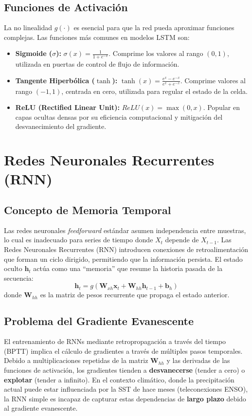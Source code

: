 \documentclass[titlepage,11pt]{report}
\begin{document}
\subsection{Funciones de Activación}
La no linealidad \(g(\cdot)\) es esencial para que la red pueda aproximar funciones complejas. Las funciones más comunes en modelos LSTM son:
\begin{itemize}
    \item \textbf{Sigmoide (\(\sigma\)):} \(\sigma(x) = \frac{1}{1+e^{-x}}\). Comprime los valores al rango \((0, 1)\), utilizada en puertas de control de flujo de información.
    \item \textbf{Tangente Hiperbólica (\(\tanh\)):} \(\tanh(x) = \frac{e^x - e^{-x}}{e^x + e^{-x}}\). Comprime valores al rango \((-1, 1)\), centrada en cero, utilizada para regular el estado de la celda.
    \item \textbf{ReLU (Rectified Linear Unit):} \(ReLU(x) = \max(0, x)\). Popular en capas ocultas densas por su eficiencia computacional y mitigación del desvanecimiento del gradiente.
\end{itemize}

\section{Redes Neuronales Recurrentes (RNN)}

\subsection{Concepto de Memoria Temporal}
Las redes neuronales \textit{feedforward} estándar asumen independencia entre muestras, lo cual es inadecuado para series de tiempo donde \(X_t\) depende de \(X_{t-1}\). Las Redes Neuronales Recurrentes (RNN) introducen conexiones de retroalimentación que forman un ciclo dirigido, permitiendo que la información persista. El estado oculto \(\mathbf{h}_t\) actúa como una ``memoria'' que resume la historia pasada de la secuencia:
\begin{equation}
    \mathbf{h}_t = g(\mathbf{W}_{xh} \mathbf{x}_t + \mathbf{W}_{hh} \mathbf{h}_{t-1} + \mathbf{b}_h)
\end{equation}
donde \(\mathbf{W}_{hh}\) es la matriz de pesos recurrente que propaga el estado anterior.

\subsection{Problema del Gradiente Evanescente}
El entrenamiento de RNNs mediante retropropagación a través del tiempo (BPTT) implica el cálculo de gradientes a través de múltiples pasos temporales. Debido a multiplicaciones repetidas de la matriz \(\mathbf{W}_{hh}\) y las derivadas de las funciones de activación, los gradientes tienden a \textbf{desvanecerse} (tender a cero) o \textbf{explotar} (tender a infinito). En el contexto climático, donde la precipitación actual puede estar influenciada por la SST de hace meses (teleconexiones ENSO), la RNN simple es incapaz de capturar estas dependencias de \textbf{largo plazo} debido al gradiente evanescente.
\end{document}
